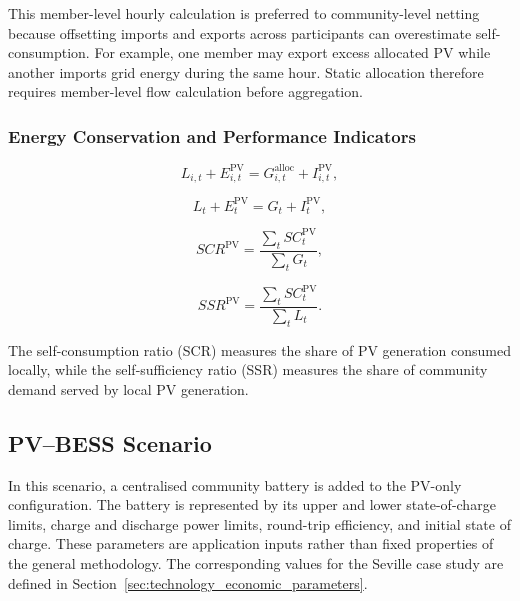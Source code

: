 This member-level hourly calculation is preferred to community-level netting because offsetting imports and exports across participants can overestimate self-consumption. For example, one member may export excess allocated PV while another imports grid energy during the same hour. Static allocation therefore requires member-level flow calculation before aggregation.

\subsubsection{Energy Conservation and Performance Indicators}
\label{subsec:energy_conservation_indicators_pv_only}

\begin{equation}
\label{eq:pv_member_energy_conservation}
L_{i,t} + E^{\mathrm{PV}}_{i,t} = G^{\mathrm{alloc}}_{i,t} + I^{\mathrm{PV}}_{i,t},
\end{equation}

\begin{equation}
\label{eq:pv_community_energy_conservation}
L_t + E^{\mathrm{PV}}_t = G_t + I^{\mathrm{PV}}_t,
\end{equation}

\begin{equation}
\label{eq:scr_pv}
SCR^{\mathrm{PV}} = \frac{\sum_t SC^{\mathrm{PV}}_t}{\sum_t G_t},
\end{equation}

\begin{equation}
\label{eq:ssr_pv}
SSR^{\mathrm{PV}} = \frac{\sum_t SC^{\mathrm{PV}}_t}{\sum_t L_t}.
\end{equation}

The self-consumption ratio (SCR) measures the share of PV generation consumed locally, while the self-sufficiency ratio (SSR) measures the share of community demand served by local PV generation.

\subsection{PV--BESS Scenario}
\label{sec:pv_bess_scenario_ch4}

In this scenario, a centralised community battery is added to the PV-only configuration. The battery is represented by its upper and lower state-of-charge limits, charge and discharge power limits, round-trip efficiency, and initial state of charge. These parameters are application inputs rather than fixed properties of the general methodology. The corresponding values for the Seville case study are defined in Section~\ref{sec:technology_economic_parameters}.

